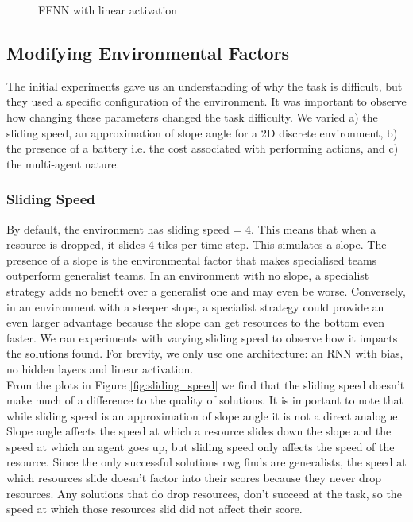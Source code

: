 \documentclass[12pt]{article}
\begin{document}
\begin{appendices}
\begin{figure}[!tbp]
  \caption{FFNN with linear activation}
  \label{fig:ffnn_linear}
\end{figure}


\subsection{Modifying Environmental Factors}

The initial experiments gave us an understanding of why the task is difficult, but they used a specific configuration of the environment. It was important to observe how changing these parameters changed the task difficulty. We varied a) the sliding speed, an approximation of slope angle for a 2D discrete environment, b) the presence of a battery i.e. the cost associated with performing actions, and c) the multi-agent nature.

\subsubsection{Sliding Speed}

By default, the environment has sliding speed = 4. This means that when a resource is dropped, it slides 4 tiles per time step. This simulates a slope. The presence of a slope is the environmental factor that makes specialised teams outperform generalist teams. In an environment with no slope, a specialist strategy adds no benefit over a generalist one and may even be worse. Conversely, in an environment with a steeper slope, a specialist strategy could provide an even larger advantage because the slope can get resources to the bottom even faster. We ran experiments with varying sliding speed to observe how it impacts the solutions found. For brevity, we only use one architecture: an RNN with bias, no hidden layers and linear activation.\\

From the plots in Figure \ref{fig:sliding_speed} we find that the sliding speed doesn't make much of a difference to the quality of solutions. It is important to note that while sliding speed is an approximation of slope angle it is not a direct analogue. Slope angle affects the speed at which a resource slides down the slope and the speed at which an agent goes up, but sliding speed only affects the speed of the resource. Since the only successful solutions rwg finds are generalists, the speed at which resources slide doesn't factor into their scores because they never drop resources. Any solutions that do drop resources, don't succeed at the task, so the speed at which those resources slid did not affect their score.\\


\end{appendices}
\end{document}
